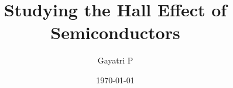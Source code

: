 \documentclass[reprint,amsmath,amssymb,aps, margin=1in]{revtex4-2}
\begin{document}
    \title{Studying the Hall Effect of Semiconductors}

    \author{Gayatri P}
    \date{\today}

    
    \maketitle

    
    
    
    
    

    
    \nocite{*}
\end{document}
